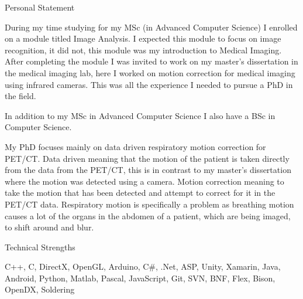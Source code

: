 \documentclass{cv} %
\begin{document}

\begin{rSection}{Personal Statement}

\item During my time studying for my MSc (in Advanced Computer Science) I enrolled on a module titled Image Analysis. I expected this module to focus on image recognition, it did not, this module was my introduction to Medical Imaging. After completing the module I was invited to work on my master’s dissertation in the medical imaging lab, here I worked on motion correction for medical imaging using infrared cameras. This was all the experience I needed to pursue a PhD in the field.

\item In addition to my MSc in Advanced Computer Science I also have a BSc in Computer Science.

\item My PhD focuses mainly on data driven respiratory motion correction for PET/CT. Data driven meaning that the motion of the patient is taken directly from the data from the PET/CT, this is in contrast to my master’s dissertation where the motion was detected using a camera. Motion correction meaning to take the motion that has been detected and attempt to correct for it in the PET/CT data. Respiratory motion is specifically a problem as breathing motion causes a lot of the organs in the abdomen of a patient, which are being imaged, to shift around and blur.

\end{rSection}


\begin{rSection}{Technical Strengths}

\item C++, C, DirectX, OpenGL, Arduino, C\#, .Net, ASP, Unity, Xamarin, Java, Android, Python, Matlab, Pascal, JavaScript, Git, SVN, BNF,  Flex, Bison, OpenDX, Soldering

\end{rSection}

\end{document}
